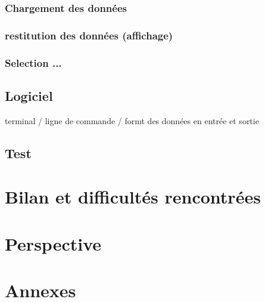 \documentclass[oneside,13pt,a4paper]{report}
\begin{document}
\subsection{Chargement des données}

\subsection{restitution des données (affichage)}

\subsection{Selection ...}

\section{Logiciel}

terminal / ligne de commande / formt des données en entrée et sortie

\section{Test}



\chapter{Bilan et difficultés rencontrées}


\chapter{Perspective}


\chapter{Annexes}
\end{document}
